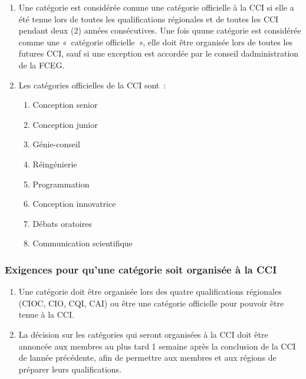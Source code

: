 \begin{enumerate}
 \item
  Une catégorie est considérée comme une catégorie officielle à la CCI si elle a été tenue lors de toutes les qualifications régionales et de toutes les CCI pendant deux (2) années consécutives. Une fois qu\textquotesingle une catégorie est considérée comme une «~catégorie officielle~», elle doit être organisée lors de toutes les futures CCI, sauf si une exception est accordée par le conseil d\textquotesingle administration de la FCEG.
 \item
  Les catégories officielles de la CCI sont~:

  \begin{enumerate}
   \item
    Conception senior
   \item
    Conception junior
   \item
    Génie-conseil
   \item
    Réingénierie
   \item
    Programmation
   \item
    Conception innovatrice
   \item
    Débats oratoires
   \item
    Communication scientifique
  \end{enumerate}

\end{enumerate}

\subsubsection{Exigences pour qu'une catégorie soit organisée à la CCI}
\label{exigences-pour-quune-categorie-soit-organisee-a-la-cci}

\begin{enumerate}
 \item
  Une catégorie doit être organisée lors des quatre qualifications régionales (CIOC, CIO, CQI, CAI) ou être une catégorie officielle pour pouvoir être tenue à la CCI.
 \item
  La décision sur les catégories qui seront organisées à la CCI doit être annoncée aux membres au plus tard 1 semaine après la conclusion de la CCI de l\textquotesingle année précédente, afin de permettre aux membres et aux régions de préparer leurs qualifications.
\end{enumerate}
